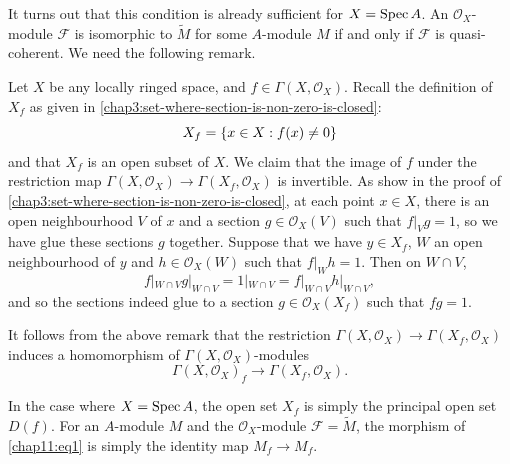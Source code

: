It turns out that this condition is already sufficient for $X = \operatorname{Spec} A$. An $\mathcal{O}_X$-module $\mathcal{F}$ is isomorphic to $\tilde{M}$ for some $A$-module $M$ if and only if $\mathcal{F}$ is quasi-coherent. We need the following remark.

\begin{remark}
	Let $X$ be any locally ringed space, and $f \in \Gamma(X, \mathcal{O}_X)$. Recall the definition of $X_f$ as given in \cref{chap3:set-where-section-is-non-zero-is-closed}:
	\begin{equation*}
		X_f = \lbrace x \in X : f(x) \neq 0\rbrace
	\end{equation*}
	and that $X_f$ is an open subset of $X$. We claim that the image of $f$ under the restriction map $\Gamma(X, \mathcal{O}_X) \to \Gamma({X_f, \mathcal{O}_X})$ is invertible. As show in the proof of \cref{chap3:set-where-section-is-non-zero-is-closed}, at each point $x \in X$, there is an open neighbourhood $V$ of $x$ and a section $g \in \mathcal{O}_X(V)$ such that $f|_V g = 1$, so we have glue these sections $g$ together. Suppose that we have $y \in X_f$, $W$ an open neighbourhood of $y$ and $h \in \mathcal{O}_X(W)$ such that $f|_W h = 1$. Then on $W \cap V$,
	\begin{equation*}
		f|_{W\cap V}g|_{W \cap V} = 1|_{W \cap V} = f|_{W \cap V} h|_{W \cap V},
	\end{equation*}
	and so the sections indeed glue to a section $g \in \mathcal{O}_X(X_f)$ such that $fg = 1$.
\end{remark}

It follows from the above remark that the restriction $\Gamma(X, \mathcal{O}_X) \to \Gamma({X_f, \mathcal{O}_X})$ induces a homomorphism of $\Gamma(X, \mathcal{O}_X)$-modules
\begin{equation}\label{chap11:eq1}
	\Gamma(X, \mathcal{O}_X)_f \to \Gamma(X_f, \mathcal{O}_X).
\end{equation}

In the case where $X = \operatorname{Spec} A$, the open set $X_f$ is simply the principal open set $D(f)$. For an $A$-module $M$ and the $\mathcal{O}_X$-module $\mathcal{F} = \tilde{M}$, the morphism of \cref{chap11:eq1} is simply the identity map $M_f \to M_f$.

